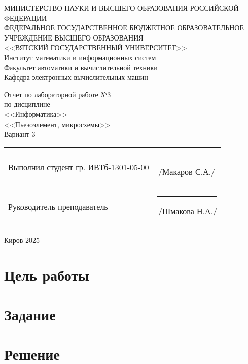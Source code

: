 \documentclass[a4paper,14pt]{extarticle}
\begin{document}
  \newpage\thispagestyle{empty}
  \begin{center}
    \MakeUppercase{
      Министерство науки и высшего образования Российской Федерации\\
      Федеральное государственное бюджетное образовательное учреждение высшего образования\\
      <<Вятский Государственный Университет>>\\
    }
    Институт математики и информационных систем\\
    Факультет автоматики и вычислительной техники\\
    Кафедра электронных вычислительных машин
  \end{center}
  \vfill

  \begin{center}
    Отчет по лабораторной работе №3\\
    по дисциплине\\
    <<Информатика>>\\
    <<Пьезоэлемент, микросхемы>>\\
    Вариант 3
  \end{center}
  \vfill

  \noindent
  \begin{tabular}{ll}
    Выполнил студент гр. ИВТб-1301-05-00 \hspace{5mm} & \rule[-1mm]{25mm}{0.10mm}\,/Макаров С.А./ \\
    Руководитель преподаватель & \rule[-1mm]{25mm}{0.10mm}\,/Шмакова Н.А./ \\
  \end{tabular}

  \vfill
  \begin{center}
    Киров 2025
  \end{center}

  \newpage
  \section*{\hspace{12.5mm}Цель работы}

  \section*{\hspace{12.5mm}Задание}

  \newpage
  \section*{\hspace{12.5mm}Решение}
\end{document}
